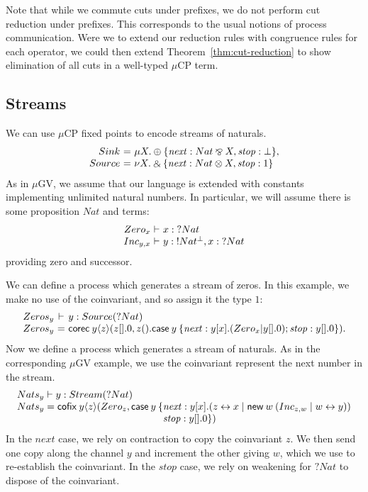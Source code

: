 \documentclass[orivec,envcountsame]{llncs}
\makeatletter
\newcommand{\with}{\mathbin\binampersand}
\newcommand{\parr}{\mathbin\bindnasrepma}
\newcommand{\cpdual}[1]{#1^\perp}
\newcommand{\cpbang}[1]{{! #1}}
\newcommand{\cpquery}[1]{{? #1}}
\newcommand{\mkwd}[1]{\mathsf{#1}}
\newcommand{\link}[2]{#1 \leftrightarrow #2}
\newcommand{\cut}[4]{\mkwd{new}\:#1 \: (#3 \mid #4)}
\newcommand{\corec}[4]{\mkwd{corec}\:{#1} \langle #2 \rangle (#3,#4)}
\newcommand{\clabel}[1]{\mathit{#1}}
\renewcommand{\case}[2]{\mkwd{case}\:#1\:\{#2\}}
\newcommand{\lrkwd}{\mkwd{cofix}}
\newcommand{\key}{\mkwd}
\newcommand{\mucp}{$\mu\mathrm{CP}$\xspace}
\newcommand{\mugv}{$\mu\mathrm{GV}$\xspace}
\newcommand{\ba}{\begin{array}}
\newcommand{\ea}{\end{array}}
\newcommand{\bl}{\ba[t]{@{}l@{}}}
\newcommand{\el}{\ea}
\newenvironment{equations}{\[\ba{@{}r@{~}c@{~}l@{}}}{\ea\]}
\newenvironment{eqs}{\ba{@{}r@{~}c@{~}l@{}}}{\ea}
\makeatother
\begin{document}
Note that while we commute cuts under prefixes, we do not perform cut reduction under prefixes.
This corresponds to the usual notions of process communication.  Were we to extend our reduction
rules with congruence rules for each operator, we could then extend Theorem~\ref{thm:cut-reduction}
to show elimination of all cuts in a well-typed \mucp term.

\subsection{Streams}

We can use \mucp fixed points to encode streams of naturals.
\begin{equations}
  Sink &=& \mu X. \oplus \{ \clabel{next}: Nat \parr X, \clabel{stop}: \bot \}, \\
  Source &=& \nu X. \with \{ \clabel{next}: Nat \otimes X, \clabel{stop}: 1 \} \\
\end{equations}%
As in \mugv, we assume that our language is extended with constants implementing unlimited
natural numbers. In particular, we will assume there is some proposition $Nat$ and terms:
\small\[
\begin{eqs}
Zero_x &\vdash& x:\cpquery{Nat} \\
Inc_{y,x} &\vdash& y:\cpbang{\cpdual{Nat}},x:\cpquery{Nat} \\
\end{eqs}
\]\normalsize
providing zero and successor.


We can define a process which generates a stream of zeros. In this example, we make no use of the
coinvariant, and so assign it the type $1$:
\small\[\begin{eqs}
  Zeros_y &\vdash& y:Source(\cpquery{Nat}) \\
  Zeros_y &=& \corec{y}{z}{z[].0}{z().\case{y}{\clabel{next}: y[x].(Zero_x | y[].0); \clabel{stop}: y[].0}}.
\end{eqs}\]\normalsize
Now we define a process which generates a stream of naturals. As in the corresponding \mugv example,
we use the coinvariant represent the next number in the stream.
%
\small\[
\bl
  Nats_y \vdash y:Stream(\cpquery{Nat}) \\
  Nats_y = \lrkwd \: y \langle z \rangle (Zero_z,
    \key{case}\:y \:\{
       \bl
       \clabel{next}: y[x].(\link{z}{x} \mid \cut{w}{}{Inc_{z,w}}{\link{w}{y}}) \\
       \clabel{stop}: y[].0\}) \\
       \el \\
\el
\]\normalsize
%
In the $\clabel{next}$ case, we rely on contraction to copy the coinvariant $z$.  We then send one
copy along the channel $y$ and increment the other giving $w$, which we use to re-establish the
coinvariant. In the $\clabel{stop}$ case, we rely on weakening for $\cpquery{Nat}$ to dispose of the
coinvariant.
\end{document}
